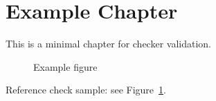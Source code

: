 \section{Example Chapter}

This is a minimal chapter for checker validation.

\begin{figure}[htbp]
	\centering
	\caption{Example figure}
	\label{fig:example}
\end{figure}

Reference check sample: see Figure~\ref{fig:example}.
